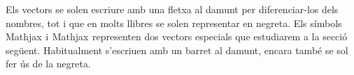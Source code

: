 Els vectors se solen escriure amb una fletxa al damunt per diferenciar-los dels nombres, tot i que en molts llibres se solen representar en negreta.
Els símbols  Mathjax  i  Mathjax  representen dos vectors especials que estudiarem a la secció següent. Habitualment s’escriuen amb un barret al damunt, encara també se sol fer ús de la negreta.